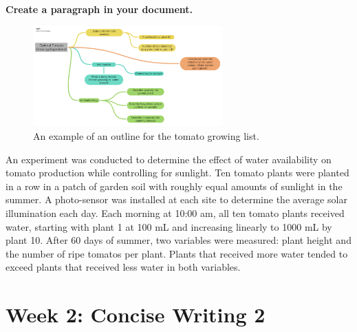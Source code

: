 \documentclass{article}
\begin{document}
\begin{enumerate}
\textbf{Create a paragraph in your document.} 
\begin{figure}[hb]
\centering
\includegraphics[width=0.65\textwidth]{figures/tomato.pdf}
\caption{\label{fig:tomato} An example of an outline for the tomato growing list.}
\end{figure}
An experiment was conducted to determine the effect of water availability on tomato production while controlling for sunlight.  Ten tomato plants were planted in a row in a patch of garden soil with roughly equal amounts of sunlight in the summer.  A photo-sensor was installed at each site to determine the average solar illumination each day.  Each morning at 10:00 am, all ten tomato plants received water, starting with plant 1 at 100 mL and increasing linearly to 1000 mL by plant 10.  After 60 days of summer, two variables were measured: plant height and the number of ripe tomatos per plant.  Plants that received more water tended to exceed plants that received less water in both variables.
\end{enumerate}

\section{Week 2: Concise Writing 2}
\end{document}
